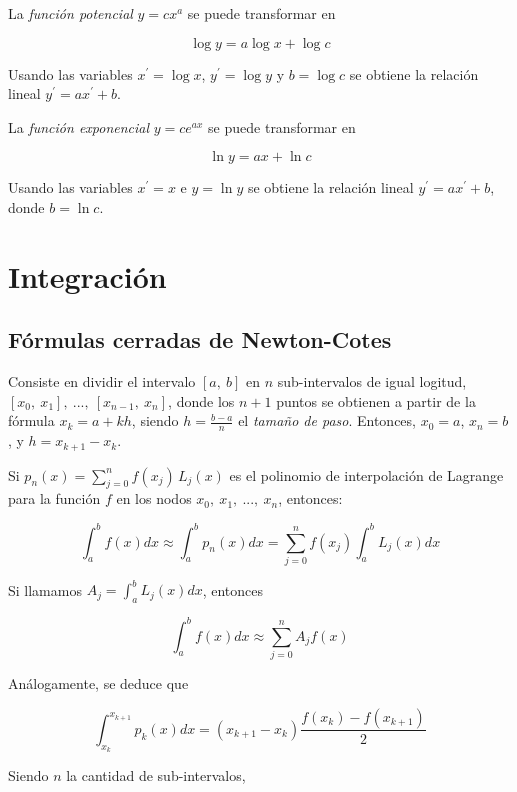 \documentclass{article}
\begin{document}
La \emph{función potencial} $y=cx^a$ se puede transformar en 

\[ \log y = a\log x + \log c \]

Usando las variables $x^\prime = \log x$, $y^\prime = \log y$ y $b = \log c$
se obtiene la relación lineal $y^\prime = ax^\prime + b$.

La \emph{función exponencial} $y = ce^{ax}$ se puede transformar en 

\[ \ln y = ax + \ln c \]

Usando las variables $x^\prime = x$ e $y = \ln y$ se obtiene la relación lineal
$y^\prime = ax^\prime + b$, donde $b = \ln c$.

\section{Integración}

\subsection{Fórmulas cerradas de Newton-Cotes}

Consiste en dividir el intervalo $[a,\ b]$ en $n$ sub-intervalos de igual 
logitud, $[x_0,\ x_1],\ ...,\ [x_{n-1},\ x_n]$, donde los $n+1$ puntos se
obtienen a partir de la fórmula $x_k = a + kh$, siendo $h = \frac{b-a}{n}$ el
\emph{tamaño de paso}. Entonces, $x_0 = a$, $x_n = b$, y $h = x_{k+1} - x_k$.

Si $p_n(x) = \sum_{j = 0}^{n} f(x_j)\,L_j(x)$ es el polinomio de interpolación
de Lagrange para la función $f$ en los nodos $x_0,\ x_1,\ ...,\ x_n$, entonces:

\begin{equation*}
    \int_a^b f(x)dx 
    \approx \int_a^b p_n(x)dx
    = \sum_{j=0}^{n} f(x_j) \int_a^b L_j(x) dx
\end{equation*}

Si llamamos $A_j = \int_a^b L_j(x) dx$, entonces

\begin{equation*}
    \int_a^b f(x)dx \approx \sum_{j=0}^{n} A_j f(x)
\end{equation*}

Análogamente, se deduce que

\begin{equation*}
\int_{x_k}^{x_{k+1}} p_k(x)dx = (x_{k+1} - x_k) \frac{f(x_k) - f(x_{k+1})}{2}
\end{equation*}

Siendo $n$ la cantidad de sub-intervalos,
\end{document}
